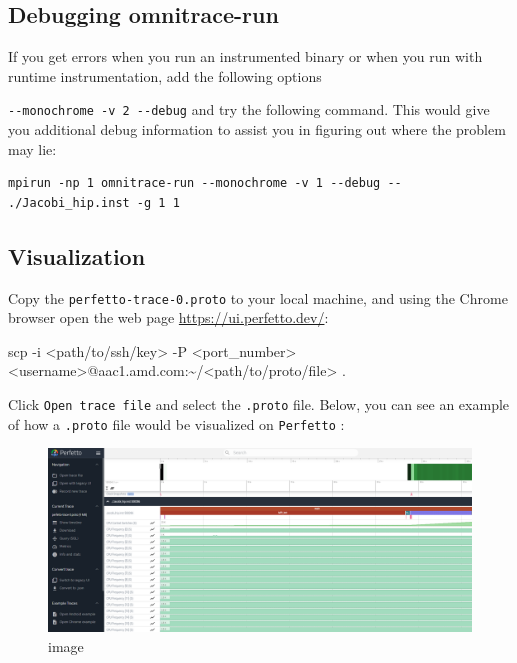 \documentclass[
]{article}
\let\oldtexttt\texttt
\renewcommand{\texttt}[1]{
  \colorbox{Light}{\oldtexttt{#1}}
}
\newenvironment{Shaded}{}{}
\newcommand{\FunctionTok}[1]{\textcolor[rgb]{0.02,0.16,0.49}{#1}}
\newcommand{\NormalTok}[1]{#1}
\newcommand{\OperatorTok}[1]{\textcolor[rgb]{0.40,0.40,0.40}{#1}}
\begin{document}
\hypertarget{debugging-omnitrace-run}{%
\subsection{Debugging omnitrace-run}\label{debugging-omnitrace-run}}

If you get errors when you run an instrumented binary or when you run
with runtime instrumentation, add the following options
\texttt{-\/-monochrome\ -v\ 2\ -\/-debug} and try the following command.
This would give you additional debug information to assist you in
figuring out where the problem may lie:

\begin{verbatim}
mpirun -np 1 omnitrace-run --monochrome -v 1 --debug -- ./Jacobi_hip.inst -g 1 1
\end{verbatim}

\hypertarget{visualization}{%
\subsection{Visualization}\label{visualization}}

Copy the \texttt{perfetto-trace-0.proto} to your local machine, and
using the Chrome browser open the web page
\url{https://ui.perfetto.dev/}:

\begin{Shaded}
\begin{Highlighting}[]
\FunctionTok{scp}\NormalTok{ {-}i }\OperatorTok{\textless{}}\NormalTok{path/to/ssh/key}\OperatorTok{\textgreater{}}\NormalTok{ {-}P }\OperatorTok{\textless{}}\NormalTok{port\_number}\OperatorTok{\textgreater{}} \OperatorTok{\textless{}}\NormalTok{username}\OperatorTok{\textgreater{}}\NormalTok{@aac1.amd.com:\textasciitilde{}/}\OperatorTok{\textless{}}\NormalTok{path/to/proto/file}\OperatorTok{\textgreater{}}\NormalTok{ .}
\end{Highlighting}
\end{Shaded}

Click \texttt{Open\ trace\ file} and select the \texttt{.proto} file.
Below, you can see an example of how a \texttt{.proto} file would be
visualized on \texttt{Perfetto}:

\begin{figure}
\centering
\includegraphics{omnitrace/6451d7916f1e33bcdf33ec974bc45cc3420c1421.png}
\caption{image}
\end{figure}
\end{document}
